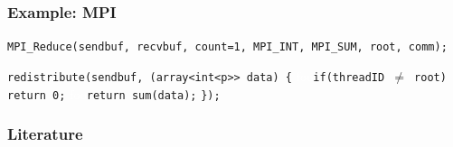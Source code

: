 \documentclass{beamer}
\begin{document}
\begin{frame}
\frametitle{Example: MPI}

\texttt{MPI\_Reduce(sendbuf, recvbuf, count=1, MPI\_INT, MPI\_SUM, root, comm);}
\bigskip

\texttt{redistribute(sendbuf, (array<int<p>> data) \{}
\textcolor{white}{foo}\texttt{if(threadID $\neq$ root) return 0;}
\newline
\textcolor{white}{foo}\texttt{return sum(data);}
\newline
\texttt{\});}
\end{frame}

\begin{frame}[allowframebreaks]
\frametitle<presentation>{Literature}    
\printbibliography
\end{frame} 	 
\end{document}
